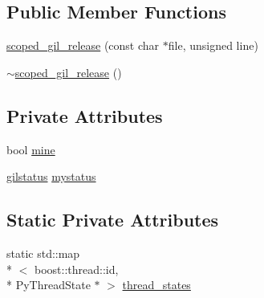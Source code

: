 \subsection*{Public Member Functions}
\begin{DoxyCompactItemize}
\item 
\hyperlink{classecto_1_1py_1_1scoped__gil__release_afd4cb62267206421eca93969a8bb0865}{scoped\-\_\-gil\-\_\-release} (const char $\ast$file, unsigned line)
\item 
\hyperlink{classecto_1_1py_1_1scoped__gil__release_addd644daf557129d6584829cda6b9cc0}{$\sim$scoped\-\_\-gil\-\_\-release} ()
\end{DoxyCompactItemize}
\subsection*{Private Attributes}
\begin{DoxyCompactItemize}
\item 
bool \hyperlink{classecto_1_1py_1_1scoped__gil__release_a9e9fbf0c5819ac1b706437d99a6459a3}{mine}
\item 
\hyperlink{structecto_1_1py_1_1gilstatus}{gilstatus} \hyperlink{classecto_1_1py_1_1scoped__gil__release_a888a6813c86b9bbd2d5cd0d4a0f7e2f2}{mystatus}
\end{DoxyCompactItemize}
\subsection*{Static Private Attributes}
\begin{DoxyCompactItemize}
\item 
static std\-::map\\*
$<$ boost\-::thread\-::id, \\*
Py\-Thread\-State $\ast$ $>$ \hyperlink{classecto_1_1py_1_1scoped__gil__release_a5ecad50e9899f01f3779ac22009af5a4}{thread\-\_\-states}
\end{DoxyCompactItemize}



